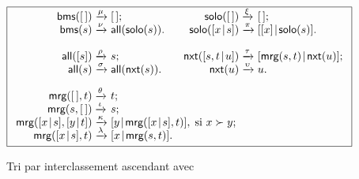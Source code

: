 \begin{figure}[H]
\begin{equation*}
\boxed{%
\begin{array}{r@{\;}l@{\;}lr@{\;}l@{\;}l}
  \fun{bms}(\el) & \xrightarrow{\smash{\mu}} & \el;
& \fun{solo}(\el) & \xrightarrow{\smash{\xi}} & \el;\\
  \fun{bms}(s) & \xrightarrow{\smash{\nu}}
               & \fun{all}(\fun{solo}(s)).
& \fun{solo}(\cons{x}{s}) & \xrightarrow{\smash{\pi}}
                          & \cons{[x]}{\fun{solo}(s)}.\\
\\
  \fun{all}([s]) & \xrightarrow{\smash{\rho}} & s;
& \fun{nxt}(\cons{s,t}{u}) & \xrightarrow{\smash{\tau}}
                         & \cons{\fun{mrg}(s,t)}{\fun{nxt}(u)};\\
  \fun{all}(s) & \xrightarrow{\smash{\sigma}}
               & \fun{all}(\fun{nxt}(s)).
& \fun{nxt}(u) & \xrightarrow{\smash{\upsilon}} & u.\\
\\
\fun{mrg}(\el,t)         & \xrightarrow{\smash{\theta}} & t;\\
\fun{mrg}(s,\el)         & \xrightarrow{\smash{\iota}} & s;\\
\fun{mrg}(\cons{x}{s},\cons{y}{t}) & \xrightarrow{\smash{\kappa}}
& \multicolumn{4}{@{}l}{\cons{y}{\fun{mrg}(\cons{x}{s},t)},
\;\text{si \(x \succ y\);}}\\
\fun{mrg}(\cons{x}{s},t) & \xrightarrow{\smash{\lambda}}
                         & \cons{x}{\fun{mrg}(s,t)}.
\end{array}}
\end{equation*}
\caption{Tri par interclassement ascendant avec }
\label{fig:bms}
\end{figure}


